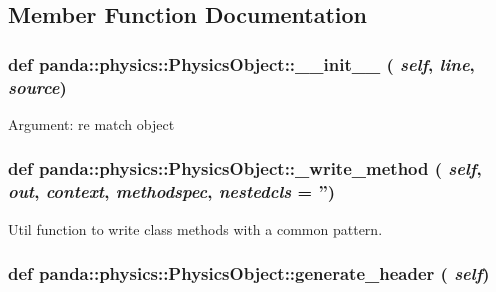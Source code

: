 \subsection{Member Function Documentation}
\hypertarget{classpanda_1_1physics_1_1PhysicsObject_ad1ec10ebcf5de122d3ce6299800706c0}{
\subsubsection[{\_\-\_\-init\_\-\_\-}]{\setlength{\rightskip}{0pt plus 5cm}def panda::physics::PhysicsObject::\_\-\_\-init\_\-\_\- ( {\em self}, \/   {\em line}, \/   {\em source})}}
\label{classpanda_1_1physics_1_1PhysicsObject_ad1ec10ebcf5de122d3ce6299800706c0}
\begin{DoxyVerb}
Argument: re match object
\end{DoxyVerb}
 \hypertarget{classpanda_1_1physics_1_1PhysicsObject_a8826db7b741f0900af2ca801e21b1e18}{
\subsubsection[{\_\-write\_\-method}]{\setlength{\rightskip}{0pt plus 5cm}def panda::physics::PhysicsObject::\_\-write\_\-method ( {\em self}, \/   {\em out}, \/   {\em context}, \/   {\em methodspec}, \/   {\em nestedcls} = {\ttfamily ''})}}
\label{classpanda_1_1physics_1_1PhysicsObject_a8826db7b741f0900af2ca801e21b1e18}
\begin{DoxyVerb}
Util function to write class methods with a common pattern.
\end{DoxyVerb}
 \hypertarget{classpanda_1_1physics_1_1PhysicsObject_a89cba40b340a08acb2f22fc52b89b847}{
\subsubsection[{generate\_\-header}]{\setlength{\rightskip}{0pt plus 5cm}def panda::physics::PhysicsObject::generate\_\-header ( {\em self})}}
